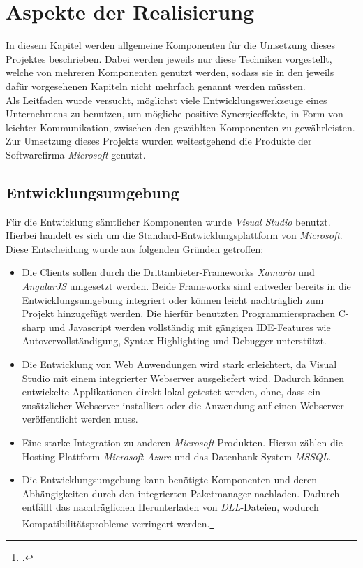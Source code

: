 \chapter{Aspekte der Realisierung}
\label{cha:realisierung}
In diesem Kapitel werden allgemeine Komponenten für die Umsetzung dieses Projektes beschrieben. Dabei werden jeweils nur diese Techniken vorgestellt, welche von mehreren Komponenten genutzt werden, sodass sie in den jeweils dafür vorgesehenen Kapiteln nicht mehrfach genannt werden müssten. \\
Als Leitfaden wurde versucht, möglichst viele Entwicklungswerkzeuge eines Unternehmens zu benutzen, um mögliche positive Synergieeffekte, in Form von leichter Kommunikation, zwischen den gewählten Komponenten zu gewährleisten. Zur Umsetzung dieses Projekts wurden weitestgehend die Produkte der Softwarefirma \textit{Microsoft} genutzt.

\section{Entwicklungsumgebung}
\label{sec:entwicklungsumgebung}
Für die Entwicklung sämtlicher Komponenten wurde \textit{\ac{Visual Studio}} benutzt. Hierbei handelt es sich um die Standard-Entwicklungsplattform von \textit{Microsoft}. Diese Entscheidung wurde aus folgenden Gründen getroffen:
\begin{itemize}
\item Die Clients sollen durch die Drittanbieter-Frameworks \textit{Xamarin} und \textit{AngularJS} umgesetzt werden. Beide Frameworks sind entweder bereits in die Entwicklungsumgebung integriert oder können leicht nachträglich zum Projekt hinzugefügt werden. Die hierfür benutzten Programmiersprachen \gls{C-sharp} und \gls{Javascript} werden vollständig mit gängigen \ac{IDE}-Features wie Autovervollständigung, Syntax-Highlighting und Debugger unterstützt. 
\item Die Entwicklung von Web Anwendungen wird stark erleichtert, da \ac{Visual Studio} mit einem integrierter Webserver ausgeliefert wird. Dadurch können entwickelte Applikationen direkt lokal getestet werden, ohne, dass ein zusätzlicher Webserver installiert oder die Anwendung auf einen Webserver veröffentlicht werden muss.
\item Eine starke Integration zu anderen \textit{Microsoft} Produkten. Hierzu zählen die Hosting-Plattform \textit{Microsoft Azure} und das Datenbank-System \textit{\ac{MSSQL}}.
\item Die Entwicklungsumgebung kann benötigte Komponenten und deren Abhängigkeiten durch den integrierten Paketmanager nachladen. Dadurch entfällt das nachträglichen Herunterladen von \textit{\ac{DLL}}-Dateien, wodurch Kompatibilitätsprobleme verringert werden.\footcite{online:VisualStudio}
\end{itemize}
